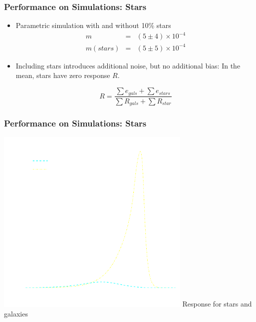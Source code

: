 \documentclass{beamer}
\begin{document}
\frame
{
    \frametitle{Performance on Simulations: Stars}

 
    \begin{itemize}

        \item Parametric simulation with and without {\color{gold} 10\% stars}
             {\color{lightskyblue} 
                 \begin{eqnarray}
                     m        & = & (5 \pm 4) \times 10^{-4} \nonumber \\
                     m(stars) & = & (5 \pm 5) \times 10^{-4} \nonumber
                 \end{eqnarray}
             }

         \item Including stars introduces additional noise, but no
             additional bias: In the mean, stars have zero response {\color{gold} $R$}.

             {\color{mygray} 
                 \begin{equation}
                     R = \frac{\sum e_{gals} + \sum e_{stars}}{\sum R_{gals} + \sum R_{star}} \nonumber
                 \end{equation}
             }


    \end{itemize}

}

\frame
{
    \frametitle{Performance on Simulations: Stars}
 
    \begin{center}
        \includegraphics[width=0.7\textwidth]{R-dt-with-stars-icolor.pdf}
        \newline
        {\large Response for stars and galaxies}
    \end{center}

}
\end{document}
